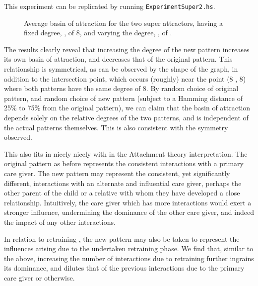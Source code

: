 This experiment can be replicated by running \texttt{ExperimentSuper2.hs}. 

\begin{figure}[h]
  \centering

\caption{Average basin of attraction for the two super attractors, \poriginsuper having a fixed degree, \dorigin, of 8, and varying the degree, \dnew, of \pnewsuper.}
\label{fig:two super plot}
\end{figure}


The results clearly reveal that increasing the degree of the new pattern increases its own basin of attraction, and decreases that of the original pattern. This relationship is symmetrical, as can be observed by the shape of the graph, in addition to the intersection point, which occurs (roughly) near the point (8 , 8) where both patterns have the same degree of 8. By random choice of original pattern, and random choice of new pattern (subject to a Hamming distance of 25\% to 75\% from the original pattern), we can claim that the basin of attraction depends solely on the relative degrees of the two patterns, and is independent of the actual patterns themselves. This is also consistent with the symmetry observed.

This also fits in nicely nicely with in the Attachment theory interpretation. The original pattern as before represents the consistent interactions with a primary care giver. The new pattern may represent the consistent, yet significantly different, interactions with an alternate and influential care giver, perhaps the other parent of the child or a relative with whom they have developed a close relationship. Intuitively, the care giver which has more interactions would exert a stronger influence, undermining the dominance of the other care giver, and indeed the impact of any other interactions.

In relation to retraining , the new pattern may also be taken to represent the influences arising due to the undertaken retraining phase. We find that, similar to the above, increasing the number of interactions due to retraining further ingrains its dominance, and dilutes that of the previous interactions due to the primary care giver or otherwise.


\let\psuper\undefined
\let\poriginsuper\undefined
\let\pnewsuper\undefined
\let\dorigin\undefined
\let\dnew\undefined
\let\prandom\undefined








